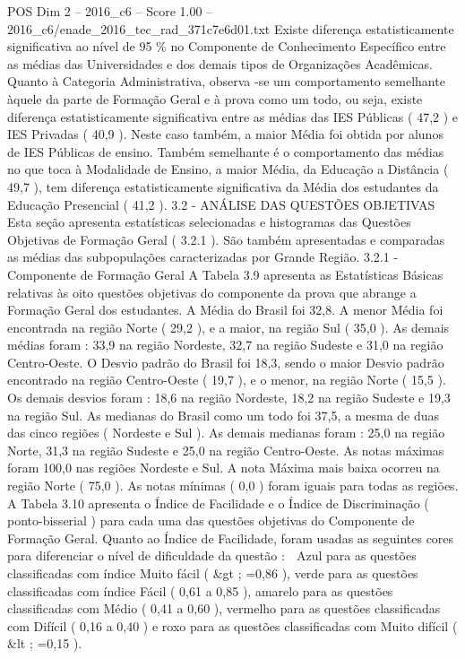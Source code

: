 \begin{textsample}{POS Dim 2 – 2016\_c6 – Score 1.00 – 2016\_c6/enade\_2016\_tec\_rad\_371c7e6d01.txt}
Existe diferença estatisticamente significativa ao nível de 95 \% no Componente de Conhecimento Específico entre as médias das Universidades e dos demais tipos de Organizações Acadêmicas.
Quanto à Categoria Administrativa, observa -se um comportamento semelhante àquele da parte de Formação Geral e à prova como um todo, ou seja, existe diferença estatisticamente significativa entre as médias das IES Públicas ( 47,2 ) e IES Privadas ( 40,9 ).
Neste caso também, a maior Média foi obtida por alunos de IES Públicas de ensino.
Também semelhante é o comportamento das médias no que toca à Modalidade de Ensino, a maior Média, da Educação a Distância ( 49,7 ), tem diferença estatisticamente significativa da Média dos estudantes da Educação Presencial ( 41,2 ). 3.2 - ANÁLISE DAS QUESTÕES OBJETIVAS Esta seção apresenta estatísticas selecionadas e histogramas das Questões Objetivas de Formação Geral ( 3.2.1 ).
São também apresentadas e comparadas as médias das subpopulações caracterizadas por Grande Região. 3.2.1 - Componente de Formação Geral A Tabela 3.9 apresenta as Estatísticas Básicas relativas às oito questões objetivas do componente da prova que abrange a Formação Geral dos estudantes.
A Média do Brasil foi 32,8.
A menor Média foi encontrada na região Norte ( 29,2 ), e a maior, na região Sul ( 35,0 ).
As demais médias foram : 33,9 na região Nordeste, 32,7 na região Sudeste e 31,0 na região Centro-Oeste.
O Desvio padrão do Brasil foi 18,3, sendo o maior Desvio padrão encontrado na região Centro-Oeste ( 19,7 ), e o menor, na região Norte ( 15,5 ).
Os demais desvios foram : 18,6 na região Nordeste, 18,2 na região Sudeste e 19,3 na região Sul.
As medianas do Brasil como um todo foi 37,5, a mesma de duas das cinco regiões ( Nordeste e Sul ).
As demais medianas foram : 25,0 na região Norte, 31,3 na região Sudeste e 25,0 na região Centro-Oeste.
As notas máximas foram 100,0 nas regiões Nordeste e Sul.
A nota Máxima mais baixa ocorreu na região Norte ( 75,0 ).
As notas mínimas ( 0,0 ) foram iguais para todas as regiões.
A Tabela 3.10 apresenta o Índice de Facilidade e o Índice de Discriminação ( ponto-bisserial ) para cada uma das questões objetivas do Componente de Formação Geral.
Quanto ao Índice de Facilidade, foram usadas as seguintes cores para diferenciar o nível de dificuldade da questão :  Azul para as questões classificadas com índice Muito fácil ( \&gt ; =0,86 ), verde para as questões classificadas com índice Fácil ( 0,61 a 0,85 ), amarelo para as questões classificadas com Médio ( 0,41 a 0,60 ), vermelho para as questões classificadas com Difícil ( 0,16 a 0,40 ) e roxo para as questões classificadas com Muito difícil ( \&lt ; =0,15 ).

\end{textsample}
